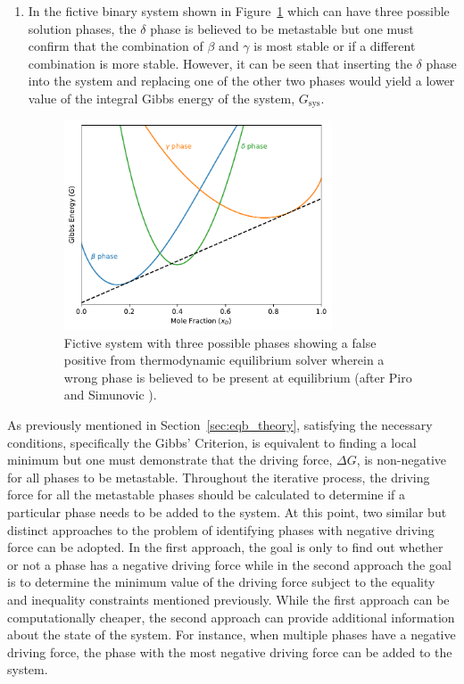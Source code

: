 \begin{enumerate}
	\item In the fictive binary system shown in Figure~\ref{fig:go_sys-CD} which can have three possible solution phases, the $\delta$ phase is believed to be metastable but one must confirm that the combination of $\beta$ and $\gamma$ is most stable or if a different combination is more stable. However, it can be seen that inserting the $\delta$ phase into the system and replacing one of the other two phases would yield a lower value of the integral Gibbs energy of the system, $G_\text{sys}$.
		\begin{figure}[htbp]
			\centering
			\includegraphics[width=0.75\textwidth]{figures/chapter-4/System_CD.pdf}
			\caption[Fictive system with three possible phases showing a false positive from thermodynamic equilibrium solver wherein a wrong phase is believed to be present at equilibrium.]{Fictive system with three possible phases showing a false positive from thermodynamic equilibrium solver wherein a wrong phase is believed to be present at equilibrium (after Piro and Simunovic \cite{Piro16}).}
			\label{fig:go_sys-CD}
		\end{figure}
	\end{enumerate}

As previously mentioned in Section~\ref{sec:eqb_theory}, satisfying the necessary conditions, specifically the Gibbs' Criterion, is equivalent to finding a local minimum but one must demonstrate that the driving force, $\Delta G$, is non-negative for all phases to be metastable. Throughout the iterative process, the driving force for all the metastable phases should be calculated to determine if a particular phase needs to be added to the system. At this point, two similar but distinct approaches to the problem of identifying phases with negative driving force can be adopted. In the first approach, the goal is only to find out whether or not a phase has a negative driving force while in the second approach the goal is to determine the minimum value of the driving force subject to the equality and inequality constraints mentioned previously. While the first approach can be computationally cheaper, the second approach can provide additional information about the state of the system. For instance, when multiple phases have a negative driving force, the phase with the most negative driving force can be added to the system. 

